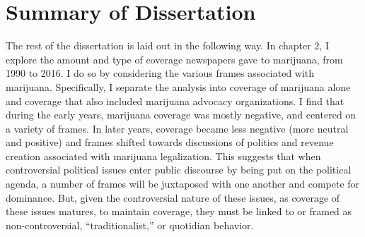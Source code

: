 











\section{Summary of Dissertation}


The rest of the dissertation is laid out in the following way. In chapter 2, I explore the amount and type of coverage newspapers gave to marijuana, from 1990 to 2016. I do so by considering the various frames associated with marijuana. Specifically, I separate the analysis into coverage of marijuana alone and coverage that also included marijuana advocacy organizations. I find that during the early years, marijuana coverage was mostly negative, and centered on a variety of frames. In later years, coverage became less negative (more neutral and positive) and frames shifted towards discussions of politics and revenue creation associated with marijuana legalization. This suggests that when controversial political issues enter public discourse by being put on the political agenda, a number of frames will be juxtaposed with one another and compete for dominance. But, given the controversial nature of these issues, as coverage of these issues matures, to maintain coverage, they must be linked to or framed as non-controversial, ``traditionalist,'' or quotidian \citep{snow_et_al_1998} behavior. 


